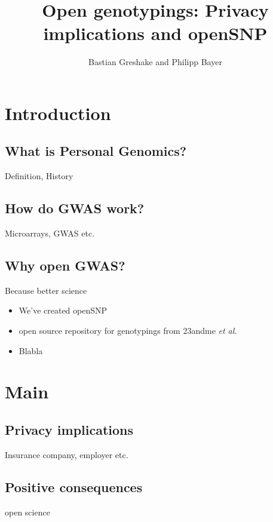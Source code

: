\documentclass[12pt,a4paper]{beamer}
\title[Open-GWAS]{Open genotypings: Privacy implications and openSNP}
\author{Bastian Greshake and Philipp Bayer}
\begin{document}
\begin{frame}
\titlepage
\end{frame}
\section{Introduction}
\subsection{What is Personal Genomics?}
\begin{frame}
Definition, History
\end{frame}
\subsection{How do GWAS work?}
\begin{frame}
Microarrays, GWAS etc.
\end{frame}
\subsection{Why open GWAS?}
\begin{frame}
Because better science
\end{frame}

\begin{frame}
\begin{itemize}
\item We've created openSNP
\item<2-> open source repository for genotypings from 23andme \textit{et al.}
\item<3-> Blabla 
\end{itemize}
\end{frame}
\section{Main}
\subsection{Privacy implications}
\begin{frame}
Insurance company, employer etc.
\end{frame}
\subsection{Positive consequences}
\begin{frame}
open science
\end{frame}
\end{document}
